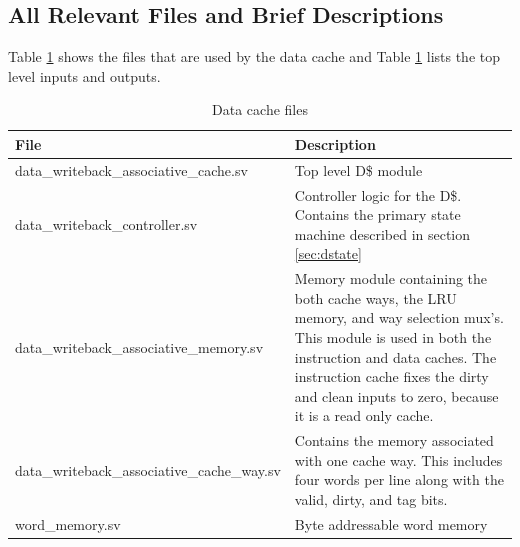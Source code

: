 \subsection{All Relevant Files and Brief Descriptions}

	Table \ref{table:drel} shows the files that are used by the data cache and Table \ref{table:drel} lists the top level inputs and outputs.

	\begin{table}
	\begin{tabular}{|l|p{70mm}|}
	\hline File  & Description \\ 
	\hline  data\_writeback\_associative\_cache.sv & Top level D\$ module \\ 
	\hline  data\_writeback\_controller.sv & Controller logic for the D\$.
	Contains the primary state machine described in section \ref{sec:dstate} \\ 
	\hline  data\_writeback\_associative\_memory.sv & 
	Memory module containing the both cache ways, the LRU memory, and way selection mux's.
	This module is used in both the instruction and data caches.
	The instruction cache fixes the dirty and clean inputs to zero, because it is a read only cache.\\ 
	\hline  data\_writeback\_associative\_cache\_way.sv & 
	Contains the memory associated with one cache way. This includes four words per line along with the valid, dirty, and tag bits. \\ 
	\hline  word\_memory.sv & Byte addressable word memory  \\
	\hline
	\end{tabular} 
	\label{table:drel}
	\caption{Data cache files}
	\end{table}

